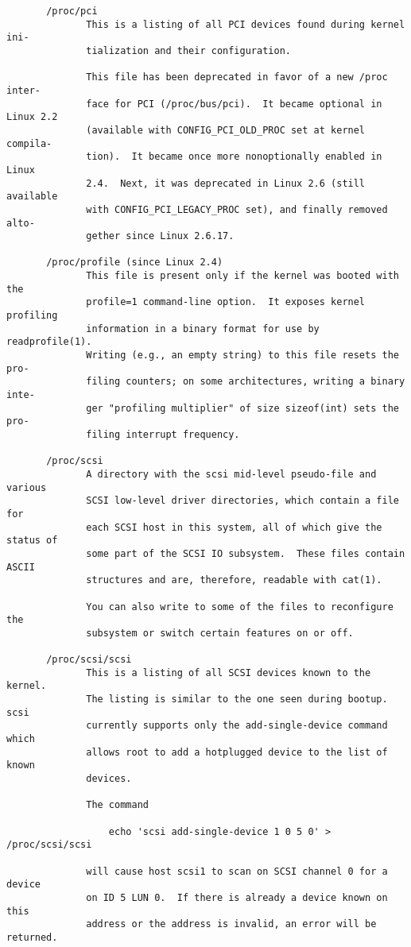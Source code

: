 \documentclass[]{article}
\begin{document}
\begin{verbatim}
       /proc/pci
              This is a listing of all PCI devices found during kernel ini‐
              tialization and their configuration.

              This file has been deprecated in favor of a new /proc inter‐
              face for PCI (/proc/bus/pci).  It became optional in Linux 2.2
              (available with CONFIG_PCI_OLD_PROC set at kernel compila‐
              tion).  It became once more nonoptionally enabled in Linux
              2.4.  Next, it was deprecated in Linux 2.6 (still available
              with CONFIG_PCI_LEGACY_PROC set), and finally removed alto‐
              gether since Linux 2.6.17.

       /proc/profile (since Linux 2.4)
              This file is present only if the kernel was booted with the
              profile=1 command-line option.  It exposes kernel profiling
              information in a binary format for use by readprofile(1).
              Writing (e.g., an empty string) to this file resets the pro‐
              filing counters; on some architectures, writing a binary inte‐
              ger "profiling multiplier" of size sizeof(int) sets the pro‐
              filing interrupt frequency.

       /proc/scsi
              A directory with the scsi mid-level pseudo-file and various
              SCSI low-level driver directories, which contain a file for
              each SCSI host in this system, all of which give the status of
              some part of the SCSI IO subsystem.  These files contain ASCII
              structures and are, therefore, readable with cat(1).

              You can also write to some of the files to reconfigure the
              subsystem or switch certain features on or off.

       /proc/scsi/scsi
              This is a listing of all SCSI devices known to the kernel.
              The listing is similar to the one seen during bootup.  scsi
              currently supports only the add-single-device command which
              allows root to add a hotplugged device to the list of known
              devices.

              The command

                  echo 'scsi add-single-device 1 0 5 0' > /proc/scsi/scsi

              will cause host scsi1 to scan on SCSI channel 0 for a device
              on ID 5 LUN 0.  If there is already a device known on this
              address or the address is invalid, an error will be returned.


\end{verbatim}
\end{document}

